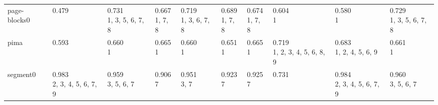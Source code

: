 \begin{tabular}{llllllllll}
page-blocks0           &                        \makecell{0.479 \\ \scriptsize{}} &  \makecell{0.731 \\ \scriptsize{1, 3, 5, 6, 7, 8}} &     \makecell{0.667 \\ \scriptsize{1, 7, 8}} &  \makecell{0.719 \\ \scriptsize{1, 3, 6, 7, 8}} &     \makecell{0.689 \\ \scriptsize{1, 7, 8}} &  \makecell{0.674 \\ \scriptsize{1, 7, 8}} &                       \makecell{0.604 \\ \scriptsize{1}} &                    \makecell{0.580 \\ \scriptsize{1}} &  \makecell{0.729 \\ \scriptsize{1, 3, 5, 6, 7, 8}} \\
pima                   &                        \makecell{0.593 \\ \scriptsize{}} &                 \makecell{0.660 \\ \scriptsize{1}} &           \makecell{0.665 \\ \scriptsize{1}} &              \makecell{0.660 \\ \scriptsize{1}} &           \makecell{0.651 \\ \scriptsize{1}} &        \makecell{0.665 \\ \scriptsize{1}} &  \makecell{0.719 \\ \scriptsize{1, 2, 3, 4, 5, 6, 8, 9}} &     \makecell{0.683 \\ \scriptsize{1, 2, 4, 5, 6, 9}} &                 \makecell{0.661 \\ \scriptsize{1}} \\
segment0               &     \makecell{0.983 \\ \scriptsize{2, 3, 4, 5, 6, 7, 9}} &        \makecell{0.959 \\ \scriptsize{3, 5, 6, 7}} &           \makecell{0.906 \\ \scriptsize{7}} &           \makecell{0.951 \\ \scriptsize{3, 7}} &           \makecell{0.923 \\ \scriptsize{7}} &        \makecell{0.925 \\ \scriptsize{7}} &                        \makecell{0.731 \\ \scriptsize{}} &  \makecell{0.984 \\ \scriptsize{2, 3, 4, 5, 6, 7, 9}} &        \makecell{0.960 \\ \scriptsize{3, 5, 6, 7}} \\

\end{tabular}
